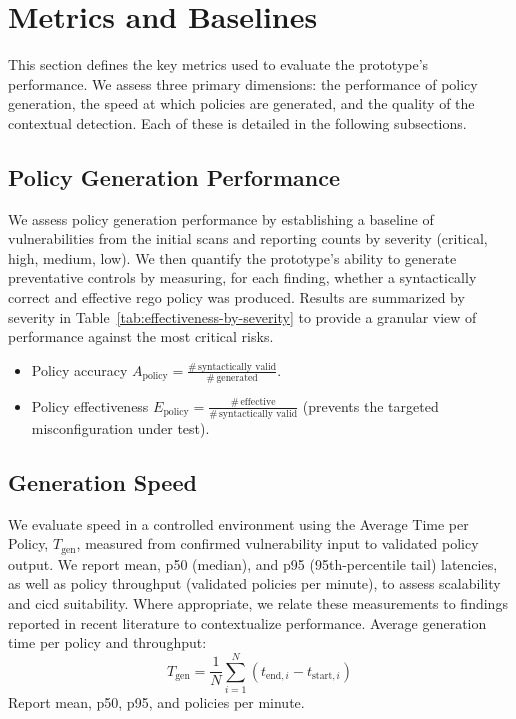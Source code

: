 \section{Metrics and Baselines}\label{sec:metrics-and-baselines}

This section defines the key metrics used to evaluate the prototype's performance. We assess three primary dimensions: the performance of policy generation, the speed at which policies are generated, and the quality of the contextual detection. Each of these is detailed in the following subsections.

\subsection{Policy Generation Performance}\label{sec:metrics-effectiveness}

We assess policy generation performance by establishing a baseline of vulnerabilities from the initial scans and reporting counts by severity (critical, high, medium, low). We then quantify the prototype’s ability to generate preventative controls by measuring, for each finding, whether a syntactically correct and effective \gls{rego} policy was produced. Results are summarized by severity in Table~\ref{tab:effectiveness-by-severity} to provide a granular view of performance against the most critical risks.
\begin{itemize}
	\item Policy accuracy $A_{\text{policy}} = \frac{\#\,\text{syntactically valid}}{\#\,\text{generated}}$.
	\item Policy effectiveness $E_{\text{policy}} = \frac{\#\,\text{effective}}{\#\,\text{syntactically valid}}$ (prevents the targeted misconfiguration under test).
\end{itemize}

\subsection{Generation Speed}\label{sec:metrics-speed}

We evaluate speed in a controlled environment using the Average Time per Policy, $T_{\text{gen}}$, measured from confirmed vulnerability input to validated policy output. We report mean, p50 (median), and p95 (95th-percentile tail) latencies, as well as policy throughput (validated policies per minute), to assess scalability and \gls{cicd} suitability. Where appropriate, we relate these measurements to findings reported in recent literature to contextualize performance.
Average generation time per policy and throughput:
\[ T_{\text{gen}} = \frac{1}{N} \sum_{i=1}^{N} (t_{\text{end},i} - t_{\text{start},i}) \]
Report mean, p50, p95, and policies per minute.


